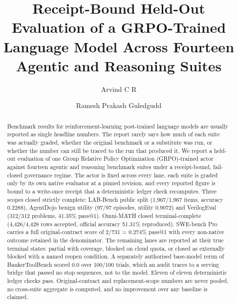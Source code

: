 \documentclass[runningheads]{llncs}
\begin{document}
\sloppy

\title{Receipt-Bound Held-Out Evaluation of a GRPO-Trained Language Model Across Fourteen Agentic and Reasoning Suites}

\author{Arvind C R \and Ramesh Prakash Guledgudd}

\maketitle

\begin{abstract}
Benchmark results for reinforcement-learning post-trained language models are
usually reported as single headline numbers. The report rarely says how much of
each suite was actually graded, whether the original benchmark or a substitute
was run, or whether the number can still be traced to the run that produced it.
We report a held-out evaluation of one Group Relative Policy Optimization
(GRPO)-trained actor against fourteen agentic and reasoning benchmark suites
under a receipt-bound, fail-closed governance regime. The actor is fixed across
every lane, each suite is graded only by its own native evaluator at a pinned
revision, and every reported figure is bound to a write-once receipt that a
deterministic ledger check recomputes. Three scopes closed strictly complete:
LAB-Bench public split (1,967/1,967 items, accuracy 0.2288), AgentDojo benign
utility (97/97 episodes, utility 0.9072) and VerilogEval (312/312 problems,
41.35\% pass@1). Omni-MATH closed terminal-complete (4,426/4,428 rows
accepted, official accuracy 51.31\% reproduced). SWE-bench Pro carries a full original-contract score of
2/731 = 0.274\% pass@1 with every non-native outcome retained in the
denominator. The remaining lanes are reported at their true terminal states:
partial with coverage, blocked on cloud quota, or closed as externally blocked
with a named reopen condition. A separately authorised base-model rerun of
BankerToolBench scored 0.0 over 100/100 trials, which an audit traces to a
serving bridge that passed no stop sequences, not to the model. Eleven of eleven
deterministic ledger checks pass. Original-contract and replacement-scope
numbers are never pooled, no cross-suite aggregate is computed, and no
improvement over any baseline is claimed.
\end{abstract}
\end{document}
